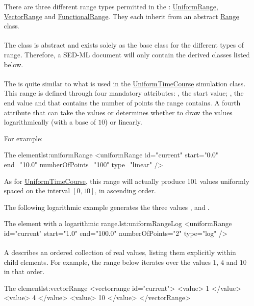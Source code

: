 There are three different range types permitted in the : \hyperref[class:uniformRange]{UniformRange}, \hyperref[class:vectorRange]{VectorRange} and \hyperref[class:functionalRange]{FunctionalRange}.
They each inherit from an abstract \hyperref[class:range]{Range} class.

\paragraph{}
\label{class:range}

The  class is abstract and exists solely as the base class for the different types of range.
Therefore, a SED-ML document will only contain the derived classes listed below.

\paragraph{}
\label{class:uniformRange}
The  is quite similar to what is used in the \hyperref[class:uniformTimeCourse]{UniformTimeCourse} simulation class.
This range is defined through four mandatory attributes: , the start value; , the end value and  that contains the number of points the range contains.
A fourth attribute  that can take the values  or  determines whether to draw the values logarithmically (with a base of $10$) or linearly.

For example:
\begin{myXmlLst}{The  element}{lst:uniformRange}
    <uniformRange id="current" start="0.0" end="10.0" numberOfPoints="100" type="linear" /> 
\end{myXmlLst}
As for \hyperref[class:uniformTimeCourse]{UniformTimeCourse}, this range will actually produce 101 values uniformly spaced on the interval $[0, 10]$, in ascending order.

The following logarithmic example generates the three values ,  and .
\begin{myXmlLst}{The  element with a logarithmic range.}{lst:uniformRangeLog}
    <uniformRange id="current" start="1.0" end="100.0" numberOfPoints="2" type="log" />
\end{myXmlLst}

\paragraph{}
\label{class:vectorRange}
A  describes an ordered collection of real values, listing them explicitly within child  elements.
For example, the range below iterates over the values $1$, $4$ and $10$ in that order.
\begin{myXmlLst}{The  element}{lst:vectorRange}
    <vectorrange id="current"> 
        <value> 1 </value> 
        <value> 4 </value> 
        <value> 10 </value> 
    </vectorRange> 
\end{myXmlLst}

